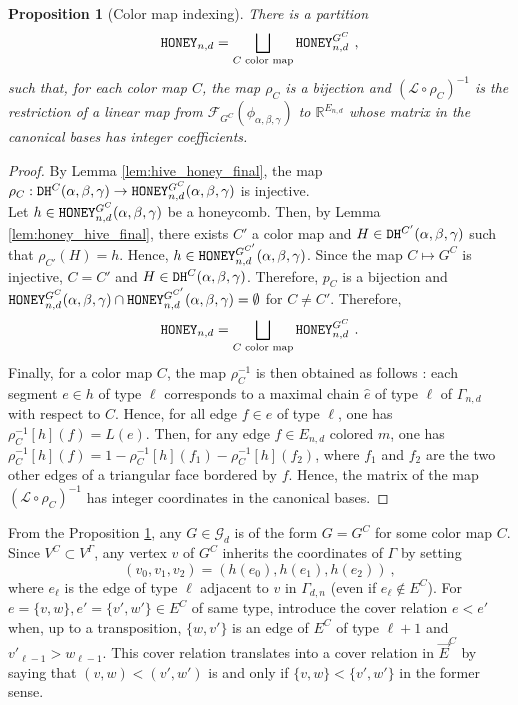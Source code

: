 \documentclass[11pt,a4paper]{amsart}
\providecommand{\honey}{\texttt{\textsc{HONEY}}}
\providecommand{\dualhive}{\texttt{\textsc{DH}}}
\numberwithin{equation}{section}
\newtheorem{proposition}[theorem]{Proposition}
\theoremstyle{definition}
\begin{document}
\begin{proposition}[Color map indexing]
    \label{prop:honey_hive}
    There is a partition 
    $$\honey_{n,d}=\bigsqcup_{C\text{ color map}}\honey_{n,d}^{G^C} \ ,$$
    such that, for each color map $C$, the map $\rho_{C}$ is a bijection and 
    $( \mathcal{L} \circ \rho_{C})^{-1}$ 
    is the restriction of a linear map from $\mathcal{F}_{G^C}(\phi_{\alpha,\beta,\gamma})$ to 
    $\mathbb{R}^{E_{n,d}}$ whose matrix in the canonical bases has integer coefficients.
\end{proposition}
\begin{proof}
    By Lemma \ref{lem:hive_honey_final}, 
    the map $\rho_C:\dualhive^C(\alpha,\beta,\gamma) \rightarrow 
    \honey_{n,d}^{G^C}(\alpha,\beta,\gamma)$ is injective. \\
    Let $h\in\honey_{n,d}^{G^C}(\alpha,\beta,\gamma)$ be a honeycomb. 
    Then, by Lemma \ref{lem:honey_hive_final}, 
    there exists $C'$ a color map and $H\in \dualhive^{C'}(\alpha,\beta,\gamma)$ 
    such that $\rho_{C'}(H)=h$. 
    Hence, $h\in \honey_{n,d}^{G^{C'}}(\alpha,\beta,\gamma)$. 
    Since the map $C\mapsto G^C$ is injective, $C=C'$ and $H\in \dualhive^{C}(\alpha,\beta,\gamma)$. 
    Therefore, $p_{C}$ is a bijection and 
    $\honey_{n,d}^{G^C}(\alpha,\beta,\gamma)\cap \honey_{n,d}^{G^{C'}}(\alpha,\beta,\gamma) 
    =\emptyset$ for $C\not=C'$. 
    Therefore,
    $$\honey_{n,d}=\bigsqcup_{C\text{ color map}}\honey_{n,d}^{G^C} \ .$$
    \noindent
    Finally, for a color map $C$, the map $\rho_C^{-1}$ is then obtained as follows : 
    each segment $e \in h$ of type $\ell$ corresponds to a maximal chain $\hat{e}$ 
    of type $\ell$ of $\Gamma_{n,d}$ 
    with respect to $C$. Hence, for all edge $f\in \hat{e}$ of type $\ell$, one has 
    $\rho_C^{-1}[h](f)=L(e)$. 
    Then, for any edge $f\in E_{n,d}$ colored $m$, one has $\rho_C^{-1}[h](f) = 
    1-\rho_C^{-1}[h](f_1)-\rho_C^{-1}[h](f_2)$, 
    where $f_1$ and $f_2$ are the two other edges of a triangular face bordered by $f$. 
    Hence, the matrix of the map $(\mathcal{L}\circ \rho_{C})^{-1}$ has integer 
    coordinates in the canonical bases.
\end{proof}

\noindent
From the Proposition \ref{prop:honey_hive}, any $G\in\mathcal{G}_d$ 
is of the form $G=G^C$ for some color map $C$. 
Since $V^C\subset V^\Gamma$, any vertex $v$ of $G^C$ inherits the coordinates of 
$\Gamma$ by setting 
$$(v_0,v_1,v_2)=(h(e_0),h(e_1),h(e_2)) \ ,$$ 
where $e_\ell$ is the edge of type $\ell$ adjacent to $v$ in $\Gamma_{d,n}$ 
(even if $e_\ell\not\in E^C$). For $e=\{v,w\},e'=\{v',w'\}\in E^C$ of same type, 
introduce the cover relation $e<e'$ when, up to a transposition, 
$\{w,v'\}$ is an edge of $E^C$ of type $\ell+1$ and $v'_{\ell-1}>w_{\ell-1}$. 
This cover relation translates into a cover relation in $\vec{E}^C$ by saying 
that $(v,w)<(v',w')$ is and only if $\{v,w\}<\{v',w'\}$ in the former sense.
\end{document}
